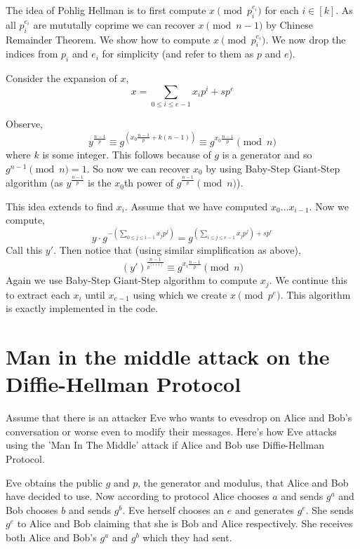 \documentclass[letterpaper,12pt]{article}
\theoremstyle{remark}
\begin{document}
The idea of Pohlig Hellman is to first compute $x \pmod {p_i^{e_i}}$ for each $i \in [k]$. As all $p_i^{e_i}$ are mututally coprime we can recover $x \pmod {n-1}$ by Chinese Remainder Theorem. We show how to compute $x \pmod {p_i^{e_i}}$. We now drop the indices from $p_i$ and $e_i$ for simplicity (and refer to them as $p$ and $e$).

Consider the expansion of $x$,
\begin{equation*}
    x = \sum_{0 \le i \le e-1} x_i p^i + sp^e
\end{equation*}

Observe,
\begin{equation*}
    y^{\frac{n-1}{p}} \equiv g^{\left(x_0 \frac{n-1}{p} + k(n-1)\right)} \equiv g^{x_0 \frac{n-1}{p}} \pmod n 
\end{equation*}
where $k$ is some integer.
This follows because of $g$ is a generator and so $g^{n-1} \pmod n = 1$. So now we can recover $x_0$ by using Baby-Step Giant-Step algorithm (as $y^{\frac{n-1}{p}}$ is the $x_0$th power of $g^{\frac{n-1}{p}} \pmod n$). 

This idea extends to find $x_i$. Assume that we have computed $x_0 \dots x_{i-1}$. Now we compute, 
\begin{equation*}
    y\cdot g^{-(\sum_{0\le j \le i-1} x_j p^j)} = g^{(\sum_{i \le j \le e-1} x_j p^j) + sp^e}
\end{equation*}
Call this $y'$. Then notice that (using similar simplification as above),
\begin{equation*}
    (y')^{\frac{n-1}{p^{(i+1)}}} \equiv g^{x_i \frac{n-1}{p}} \pmod n 
\end{equation*}
Again we use Baby-Step Giant-Step algorithm to compute $x_j$. We continue this to extract each $x_i$ until $x_{e-1}$ using which we create $x \pmod {p^e}$. This algorithm is exactly implemented in the code.

\section{Man in the middle attack on the Diffie-Hellman Protocol}

Assume that there is an attacker Eve who wants to evesdrop on Alice and Bob's conversation or worse even to modify their messages. Here's how Eve attacks using the 'Man In The Middle' attack if Alice and Bob use Diffie-Hellman Protocol.

Eve obtains the public $g$ and $p$, the generator and modulus, that Alice and Bob have decided to use. Now according to protocol Alice chooses $a$ and sends $g^a$ and Bob chooses $b$ and sends $g^b$. Eve herself chooses an $e$ and generates $g^e$. She sends $g^e$ to Alice and Bob claiming that she is Bob and Alice respectively. She receives both Alice and Bob's $g^a$ and $g^b$ which they had sent. 
\end{document}
